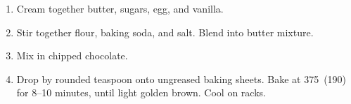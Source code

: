 
\begin{ingredients}
\end{ingredients}


\begin{recipe}
  \begin{enumerate}

  \item Cream together butter, sugars, egg, and vanilla.

  \item Stir together flour, baking soda, and salt.  Blend into butter
    mixture.

  \item Mix in chipped chocolate.

  \item Drop by rounded teaspoon onto ungreased baking sheets.  Bake
    at 375\F\ (190\degreeC) for 8--10 minutes, until light golden brown.  Cool on
    racks.

  \end{enumerate}
\end{recipe}
